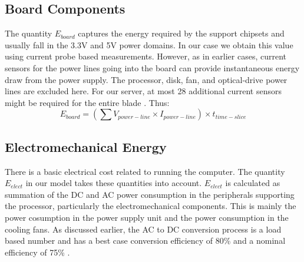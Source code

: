 \documentclass[12pt,onecolumn]{ULieeetran}
\begin{document}
\subsection{Board Components}
\label{sec:board}
The quantity $E_{board}$ captures the energy required by the support
chipsets and usually fall in the 3.3V and 5V power
domains. In our case we obtain this value using current probe based
measurements. However, as in earlier cases, current
sensors for the power lines going into the board can provide
instantaneous energy draw from the power supply. The processor,
disk, fan, and optical-drive power lines are excluded here. For our
server, at most 28 additional current sensors might be required for
the entire blade \cite{SSI2004}. Thus:
\begin{equation*}
\label{eq:board}
E_{board} = \left(\sum V_{power-line}\times I_{power-line}\right) \times t_{time-slice}
\end{equation*}

\subsection{Electromechanical Energy}
\label{sec:electrical}
There is a basic electrical cost related to running the computer. The
quantity $E_{elect}$ in our model takes these quantities into account.
$E_{elect}$ is calculated as summation of the DC and AC power
consumption in the peripherals supporting the processor, particularly
the electromechanical components. This is mainly the power cosumption in
the power supply unit and the power consumption in the cooling fans.
As discussed earlier, the AC to DC conversion process is a load based number and
has a best case conversion efficiency of 80\% and a nominal efficiency of 75\% .
\end{document}
